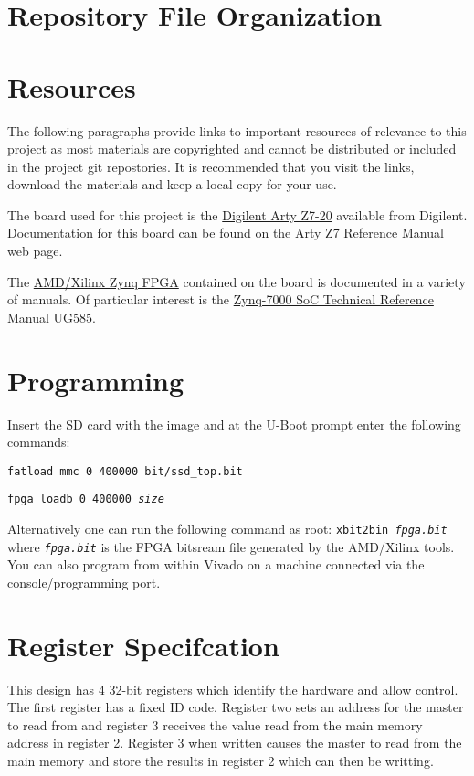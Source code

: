\documentclass{report}
\begin{document}
\chapter{Repository File Organization}

\chapter{Resources}
The following paragraphs provide links to important resources of
relevance to this project as most materials are copyrighted and
cannot be distributed or included in the project git repostories.
It is recommended that you visit the links, download the materials
and keep a local copy for your use.

The board used for this project is the 
\href{https://digilent.com/shop/arty-z7-zynq-7000-soc-development-board/}
{Digilent Arty Z7-20}
available from Digilent.  Documentation for this board can be found on the
\href{https://digilent.com/reference/programmable-logic/arty-z7/reference-manual?redirect=1}
{Arty Z7 Reference Manual} web page. 

The \href{https://www.amd.com/en/products/adaptive-socs-and-fpgas/soc/zynq-7000.html}
{AMD/Xilinx Zynq FPGA} contained on the board is documented in a variety
of manuals.  Of particular interest is the
\href{https://docs.xilinx.com/v/u/en-US/ug585-Zynq-7000-TRM}
{Zynq-7000 SoC Technical Reference Manual UG585}.

\chapter{Programming}
Insert the SD card with the image and at the U-Boot prompt enter the following
commands:

\texttt{fatload mmc 0 400000 bit/ssd\_top.bit}

\texttt{fpga loadb 0 400000 \textit{size}}

Alternatively one can run the following command as root:
\texttt{xbit2bin \textit{fpga.bit}} where \texttt{\textit{fpga.bit}} is the
FPGA bitsream file generated by the AMD/Xilinx tools.  You can also program
from within Vivado on a machine connected via the console/programming port.

\chapter{Register Specifcation}
This design has 4 32-bit registers which identify the hardware and allow control.
The first register has a fixed ID code.  Register two sets an address for the master
to read from and register 3 receives the value read from the main memory address in
register 2.  Register 3 when written causes the master to read from the main memory
and store the results in register 2 which can then be writting.
\end{document}
